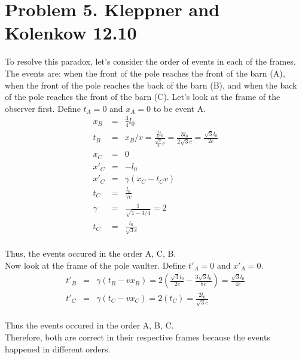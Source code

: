 \documentclass[11pt]{amsart}
\begin{document}
\section*{Problem 5. Kleppner and Kolenkow 12.10}
To resolve this paradox, let's consider the order of events in each of the frames. The events are: when the front of the pole reaches the front of the barn (A), when the front of the pole reaches the back of the barn (B), and when the back of the pole reaches the front of the barn (C). Let's look at the frame of the observer first. Define $t_{A}=0$ and $x_{A}=0$ to be event A. \\
\begin{eqnarray*} 
x_{B} &=& \frac{3}{4}l_{0} \\
t_{B} &=& x_{B}/v = \frac{\frac{3}{4}l_{0}}{\frac{\sqrt{3}}{2}c} = \frac{3l_{0}}{2\sqrt{3}c}= \frac{\sqrt{3}l_{0}}{2c}  \\
x_{C} &=& 0 \\
x'_{C} &=& -l_{0} \\
x'_{C} &=& \gamma(x_{C}-t_{C}v) \\
t_{C} &=& \frac{l_{0}}{\gamma{v}} \\
\gamma &=& \frac{1}{\sqrt{1-3/4}} = 2 \\
t_{C} &=& \frac{l_{0}}{\sqrt{3}c} 
\end{eqnarray*} \\
Thus, the events occured in the order A, C, B. \\
Now look at the frame of the pole vaulter. Define $t'_{A}=0$ and $x'_{A}=0$. \\
\begin{eqnarray*} 
t'_{B} &=& \gamma(t_{B}-vx_{B}) = 2(\frac{\sqrt{3}l_{0}}{2c}-\frac{3\sqrt{3}l_{0}}{8c}) = \frac{\sqrt{3}l_{0}}{4c} \\
t'_{C} &=& \gamma(t_{C}-vx_{C}) = 2(t_{C}) =\frac{2l_{0}}{\sqrt{3}c} 
\end{eqnarray*} \\
Thus the events occured in the order A, B, C. \\
Therefore, both are correct in their respective frames because the events happened in different orders. \\
\end{document}
